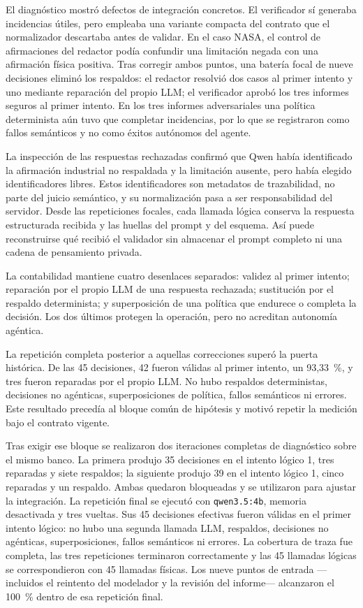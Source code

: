 El diagnóstico mostró defectos de integración concretos. El verificador sí
generaba incidencias útiles, pero empleaba una variante compacta del contrato
que el normalizador descartaba antes de validar. En el caso NASA, el control de
afirmaciones del redactor podía confundir una limitación negada con una
afirmación física positiva. Tras corregir ambos puntos, una batería focal de
nueve decisiones eliminó los respaldos: el redactor resolvió dos casos al
primer intento y uno mediante reparación del propio LLM; el verificador aprobó
los tres informes seguros al primer intento. En los tres informes adversariales
una política determinista aún tuvo que completar incidencias, por lo que se
registraron como fallos semánticos y no como éxitos autónomos del agente.

La inspección de las respuestas rechazadas confirmó que Qwen había identificado
la afirmación industrial no respaldada y la limitación ausente, pero había
elegido identificadores libres. Estos identificadores son metadatos de
trazabilidad, no parte del juicio semántico, y su normalización pasa a ser
responsabilidad del servidor. Desde las repeticiones focales, cada llamada
lógica conserva la respuesta estructurada recibida y las huellas del prompt y
del esquema. Así puede reconstruirse qué recibió el validador sin almacenar el
prompt completo ni una cadena de pensamiento privada.

La contabilidad mantiene cuatro desenlaces separados: validez al primer
intento; reparación por el propio LLM de una respuesta rechazada; sustitución
por el respaldo determinista; y superposición de una política que endurece o
completa la decisión. Los dos últimos protegen la operación, pero no acreditan
autonomía agéntica.

La repetición completa posterior a aquellas correcciones superó la puerta
histórica. De las 45 decisiones, 42 fueron válidas al primer intento, un
93,33~\%, y tres fueron reparadas por el propio LLM. No hubo respaldos
deterministas, decisiones no agénticas, superposiciones de política, fallos
semánticos ni errores. Este resultado precedía al bloque común de hipótesis y
motivó repetir la medición bajo el contrato vigente.

Tras exigir ese bloque se realizaron dos iteraciones completas de diagnóstico
sobre el mismo banco. La primera produjo 35 decisiones en el intento lógico 1,
tres reparadas y siete respaldos; la siguiente produjo 39 en el intento lógico 1, cinco
reparadas y un respaldo. Ambas quedaron bloqueadas y se utilizaron para ajustar
la integración. La repetición final se ejecutó con \texttt{qwen3.5:4b}, memoria
desactivada y tres vueltas. Sus 45 decisiones efectivas fueron válidas en el
primer intento lógico: no hubo una segunda llamada LLM, respaldos, decisiones no
agénticas, superposiciones, fallos semánticos ni errores. La cobertura de traza
fue completa, las tres repeticiones terminaron correctamente y las 45 llamadas
lógicas se correspondieron con 45 llamadas físicas. Los nueve puntos de entrada
---incluidos el reintento del modelador y la revisión del informe--- alcanzaron
el 100~\% dentro de esa repetición final.


